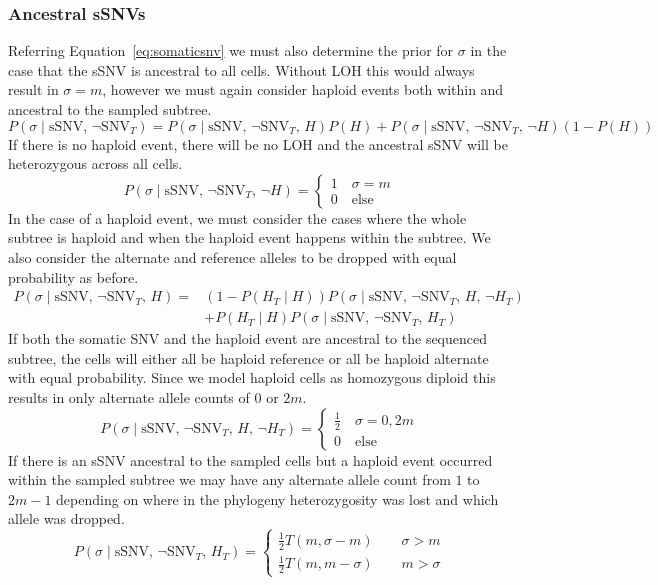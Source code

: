 \documentclass[../../main.tex]{subfiles}
\begin{document}
\subsubsection*{Ancestral sSNVs}
Referring Equation~\eqref{eq:somaticsnv} we must also determine the prior for $\sigma$ in the case that the sSNV is ancestral to all cells.
Without LOH this would always result in $\sigma=m$, however we must again consider haploid events both within and ancestral to the sampled subtree.
\begin{equation} \label{eq:ancestralsnv}
P(\sigma\mid\text{sSNV},\,\neg\text{SNV}_T)=P(\sigma\mid\text{sSNV},\,\neg\text{SNV}_T,\,H)P(H)+P(\sigma\mid\text{sSNV},\,\neg\text{SNV}_T,\,\neg H)(1-P(H))
\end{equation}
If there is no haploid event, there will be no LOH and the ancestral sSNV will be heterozygous across all cells.
\begin{equation*}
P(\sigma\mid\text{sSNV},\,\neg\text{SNV}_T,\,\neg H) = \begin{cases}1\quad \sigma=m\\ 0\quad\text{else}\end{cases}
\end{equation*}
In the case of a haploid event, we must consider the cases where the whole subtree is haploid and when the haploid event happens within the subtree.
We also consider the alternate and reference alleles to be dropped with equal probability as before.
\begin{align*}
P(\sigma\mid\text{sSNV},\,\neg\text{SNV}_T,\,H)=&(1-P(H_T\mid H))P(\sigma\mid \text{sSNV},\,\neg\text{SNV}_T,\,H,\,\neg H_T)\\
&+P(H_T\mid H)P(\sigma\mid \text{sSNV},\,\neg\text{SNV}_T,\,H_T)
\end{align*}
If both the somatic SNV and the haploid event are ancestral to the sequenced subtree, the cells will either all be haploid reference or all be haploid alternate with equal probability.
Since we model haploid cells as homozygous diploid this results in only alternate allele counts of $0$ or $2m$.
\begin{equation*}
P(\sigma\mid\text{sSNV},\,\neg\text{SNV}_T,\,H,\,\neg H_T)= \begin{cases} \frac{1}{2} \quad \sigma=0,2m\\0\quad \text{else} \end{cases}
\end{equation*}
If there is an sSNV ancestral to the sampled cells but a haploid event occurred within the sampled subtree we may have any alternate allele count from $1$ to $2m-1$ depending on where in the phylogeny heterozygosity was lost and which allele was dropped.
\begin{equation*}
P(\sigma\mid\text{sSNV},\,\neg\text{SNV}_T,\,H_T) = \begin{cases} \frac{1}{2}T(m,\sigma-m)\qquad \sigma > m\\
\frac{1}{2}T(m,m-\sigma)\qquad m > \sigma \end{cases}
\end{equation*}
\end{document}
